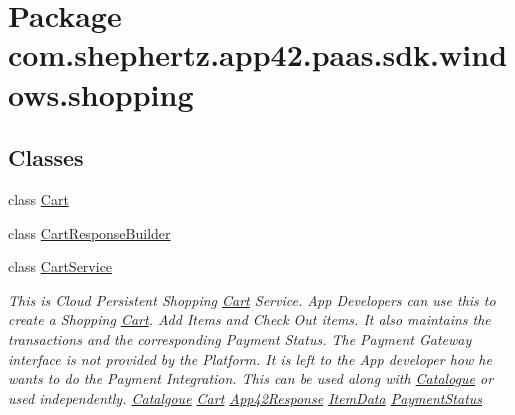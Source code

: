 \hypertarget{namespacecom_1_1shephertz_1_1app42_1_1paas_1_1sdk_1_1windows_1_1shopping}{\section{Package com.\+shephertz.\+app42.\+paas.\+sdk.\+windows.\+shopping}
\label{namespacecom_1_1shephertz_1_1app42_1_1paas_1_1sdk_1_1windows_1_1shopping}
}
\subsection*{Classes}
\begin{DoxyCompactItemize}
\item 
class \hyperlink{classcom_1_1shephertz_1_1app42_1_1paas_1_1sdk_1_1windows_1_1shopping_1_1_cart}{Cart}
\item 
class \hyperlink{classcom_1_1shephertz_1_1app42_1_1paas_1_1sdk_1_1windows_1_1shopping_1_1_cart_response_builder}{Cart\+Response\+Builder}
\item 
class \hyperlink{classcom_1_1shephertz_1_1app42_1_1paas_1_1sdk_1_1windows_1_1shopping_1_1_cart_service}{Cart\+Service}
\begin{DoxyCompactList}\small\item\em This is Cloud Persistent Shopping \hyperlink{classcom_1_1shephertz_1_1app42_1_1paas_1_1sdk_1_1windows_1_1shopping_1_1_cart}{Cart} Service. App Developers can use this to create a Shopping \hyperlink{classcom_1_1shephertz_1_1app42_1_1paas_1_1sdk_1_1windows_1_1shopping_1_1_cart}{Cart}. Add Items and Check Out items. It also maintains the transactions and the corresponding Payment Status. The Payment Gateway interface is not provided by the Platform. It is left to the App developer how he wants to do the Payment Integration. This can be used along with \hyperlink{classcom_1_1shephertz_1_1app42_1_1paas_1_1sdk_1_1windows_1_1shopping_1_1_catalogue}{Catalogue} or used independently. \hyperlink{classcom_1_1shephertz_1_1app42_1_1paas_1_1sdk_1_1windows_1_1shopping_1_1_cart_service}{Catalgoue} \hyperlink{classcom_1_1shephertz_1_1app42_1_1paas_1_1sdk_1_1windows_1_1shopping_1_1_cart_service}{Cart} \hyperlink{classcom_1_1shephertz_1_1app42_1_1paas_1_1sdk_1_1windows_1_1shopping_1_1_cart_service}{App42\+Response} \hyperlink{classcom_1_1shephertz_1_1app42_1_1paas_1_1sdk_1_1windows_1_1shopping_1_1_cart_service}{Item\+Data} \hyperlink{classcom_1_1shephertz_1_1app42_1_1paas_1_1sdk_1_1windows_1_1shopping_1_1_cart_service}{Payment\+Status} \end{DoxyCompactList}\item 

\end{DoxyCompactItemize}
